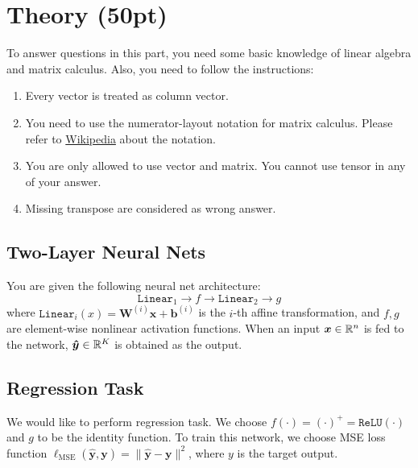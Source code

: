 \section{Theory (50pt)}

To answer questions in this part, you need some basic knowledge of linear algebra and matrix calculus. Also, you need to follow the instructions:
\begin{enumerate}
\item Every vector is treated as column vector.
\item You need to use the numerator-layout notation for matrix calculus. Please refer to  \href{https://en.wikipedia.org/wiki/Matrix_calculus#Numerator-layout_notation}{Wikipedia} about the notation.
\item You are only allowed to use vector and matrix.
You cannot use tensor in any of your answer.
\item Missing transpose are considered as wrong answer.
\end{enumerate}

\subsection{Two-Layer Neural Nets}


You are given the following neural net architecture:
%
\[
\texttt{Linear}_1 \to f \to \texttt{Linear}_2 \to g
\]
%
where $\texttt{Linear}_i (x) = \bm{W}^{(i)}\bm x + \bm b^{(i)}$ is the $i$-th affine transformation, and $f, g$ are element-wise nonlinear activation functions.
When an input $\bm x \in \mathbb{R}^n$ is fed to the network, $ \bm {\hat{y}} \in \mathbb{R}^K$ is obtained as the output.

\subsection{Regression Task}
We would like to perform regression task.
We choose $f(\cdot) = (\cdot)^+ = \texttt{ReLU}(\cdot)$ and $g$ to be the identity function.
To train this network, we choose MSE loss function $\ell_\text{MSE}(\bm{\hat{y}}, \bm{y}) = \| \bm{\hat{y}} - \bm{y} \|^2$, where $y$ is the target output.

